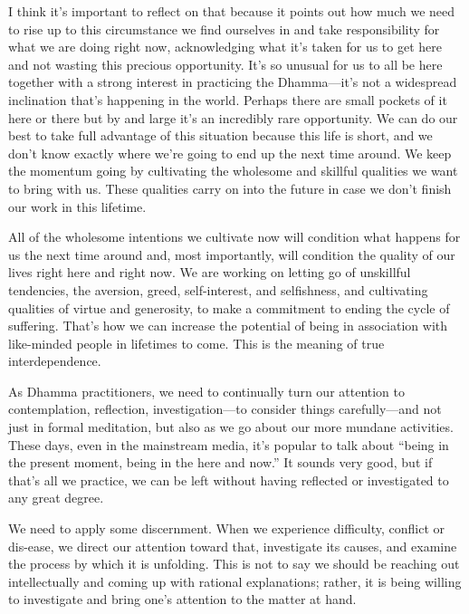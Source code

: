I think it's important to reflect on that because it points out how 
much we need to rise up to this circumstance we find ourselves in and 
take responsibility for what we are doing right now, acknowledging what 
it's taken for us to get here and not wasting this precious 
opportunity. It's so unusual for us to all be here together with a 
strong interest in practicing the Dhamma---it's not a widespread 
inclination that's happening in the world. Perhaps there are small 
pockets of it here or there but by and large it's an incredibly rare 
opportunity. We can do our best to take full advantage of this 
situation because this life is short, and we don't know exactly where 
we're going to end up the next time around. We keep the momentum going 
by cultivating the wholesome and skillful qualities we want to bring 
with us. These qualities carry on into the future in case we don't 
finish our work in this lifetime.

All of the wholesome intentions we cultivate now will condition what 
happens for us the next time around and, most importantly, will 
condition the quality of our lives right here and right now. We are 
working on letting go of unskillful tendencies, the aversion, greed, 
self-interest, and selfishness, and cultivating qualities of virtue and 
generosity, to make a commitment to ending the cycle of suffering. 
That's how we can increase the potential of being in association with 
like-minded people in lifetimes to come. This is the meaning of true 
interdependence.


As Dhamma practitioners, we need to continually turn our attention to 
contemplation, reflection, investigation---to consider things 
carefully---and not just in formal meditation, but also as we go about 
our more mundane activities. These days, even in the mainstream media, 
it's popular to talk about ``being in the present moment, being in the 
here and now.'' It sounds very good, but if that's all we practice, we 
can be left without having reflected or investigated to any great 
degree.

We need to apply some discernment. When we experience difficulty, 
conflict or dis-ease, we direct our attention toward that, investigate 
its causes, and examine the process by which it is unfolding. This is 
not to say we should be reaching out intellectually and coming up with 
rational explanations; rather, it is being willing to investigate and 
bring one's attention to the matter at hand.

